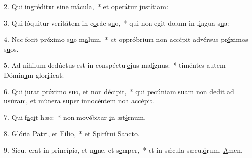 2. Qui ingréditur sine m\uline{á}c\uline{u}la,~* et oper\uline{á}tur just\uline{í}tiam:\par 
3. Qui lóquitur veritátem in c\uline{o}rde s\uline{u}o,~* qui non egit dolum in l\uline{i}ngua s\uline{u}a:\par 
4. Nec fecit próximo s\uline{u}o m\uline{a}lum,~* et oppróbrium non accépit advérsus pr\uline{ó}ximos s\uline{u}os.\par 
5. Ad níhilum dedúctus est in conspéctu \uline{e}jus mal\uline{í}gnus:~* timéntes autem Dómin\uline{u}m glor\uline{í}ficat:\par 
6. Qui jurat próximo suo, et non d\uline{é}c\uline{i}pit,~* qui pecúniam suam non dedit ad usúram, et múnera super innocéntem n\uline{o}n acc\uline{é}pit.\par 
7. Qui f\uline{a}c\uline{i}t hæc:~* non movébitur \uline{i}n æt\uline{é}rnum.\par 
8. Glória Patri, et F\uline{í}l\uline{i}o,~* et Spir\uline{í}tui S\uline{a}ncto.\par 
9. Sicut erat in princípio, et n\uline{u}nc, et s\uline{e}mper,~* et in sǽcula sæcul\uline{ó}rum. \uline{A}men.\par 

